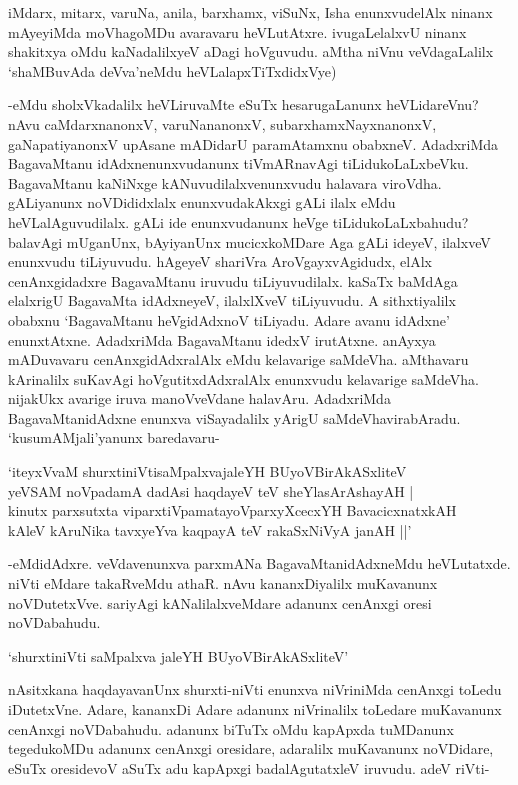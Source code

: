 iMdarx, mitarx, varuNa, anila, barxhamx, viSuNx, Isha enunxvudelAlx ninanx mAyeyiMda moVhagoMDu avaravaru heVLutAtxre. ivugaLelalxvU ninanx shakitxya oMdu kaNadalilxyeV aDagi hoVguvudu. aMtha niVnu veVdagaLalilx `shaMBuvAda deVva'neMdu heVLalapxTiTxdidxVye)

-eMdu sholxVkadalilx heVLiruvaMte eSuTx hesarugaLanunx heVLidareVnu? nAvu caMdarxnanonxV, varuNananonxV, subarxhamxNayxnanonxV, gaNapatiyanonxV upAsane mADidarU paramAtamxnu obabxneV. AdadxriMda BagavaMtanu idAdxnenunxvudanunx tiVmARnavAgi tiLidukoLaLxbeVku. BagavaMtanu kaNiNxge kANuvudilalxvenunxvudu halavara viroVdha. gALiyanunx noVDididxlalx enunxvudakAkxgi gALi ilalx eMdu heVLalAguvudilalx. gALi ide enunxvudanunx heVge tiLidukoLaLxbahudu? balavAgi mUganUnx, bAyiyanUnx mucicxkoMDare Aga gALi ideyeV, ilalxveV enunxvudu tiLiyuvudu. hAgeyeV shariVra AroVgayxvAgidudx, elAlx cenAnxgidadxre BagavaMtanu iruvudu tiLiyuvudilalx. kaSaTx baMdAga elalxrigU BagavaMta idAdxneyeV, ilalxlXveV tiLiyuvudu. A sithxtiyalilx obabxnu `BagavaMtanu heVgidAdxnoV tiLiyadu. Adare avanu idAdxne' enunxtAtxne. AdadxriMda BagavaMtanu idedxV irutAtxne. anAyxya mADuvavaru cenAnxgidAdxralAlx eMdu kelavarige saMdeVha. aMthavaru kArinalilx suKavAgi hoVgutitxdAdxralAlx enunxvudu kelavarige saMdeVha. nijakUkx avarige iruva manoVveVdane halavAru. AdadxriMda BagavaMtanidAdxne enunxva viSayadalilx yArigU saMdeVhavirabAradu. `kusumAMjali'yanunx baredavaru-

\begin{shloka}
`iteyxVvaM shurxtiniVtisaMpalxvajaleYH BUyoVBirAkASxliteV\\
yeVSAM noVpadamA dadAsi haqdayeV teV sheYlasArAshayAH |\\
kinutx parxsutxta viparxtiVpamatayoVparxyXcecxYH BavacicxnatxkAH\\
kAleV kAruNika tavxyeYva kaqpayA teV rakaSxNiVyA janAH ||'
\end{shloka}

-eMdidAdxre. veVdavenunxva parxmANa BagavaMtanidAdxneMdu heVLutatxde. niVti eMdare takaRveMdu athaR. nAvu kananxDiyalilx muKavanunx noVDutetxVve. sariyAgi kANalilalxveMdare adanunx cenAnxgi oresi noVDabahudu.

\begin{shloka}
`shurxtiniVti saMpalxva jaleYH BUyoVBirAkASxliteV'
\end{shloka}

nAsitxkana haqdayavanUnx shurxti-niVti enunxva niVriniMda cenAnxgi toLedu iDutetxVne. Adare, kananxDi Adare adanunx niVrinalilx toLedare muKavanunx cenAnxgi noVDabahudu. adanunx biTuTx oMdu kapApxda tuMDanunx tegedukoMDu adanunx cenAnxgi oresidare, adaralilx muKavanunx noVDidare, eSuTx oresidevoV aSuTx adu kapApxgi badalAgutatxleV iruvudu. adeV riVti-

